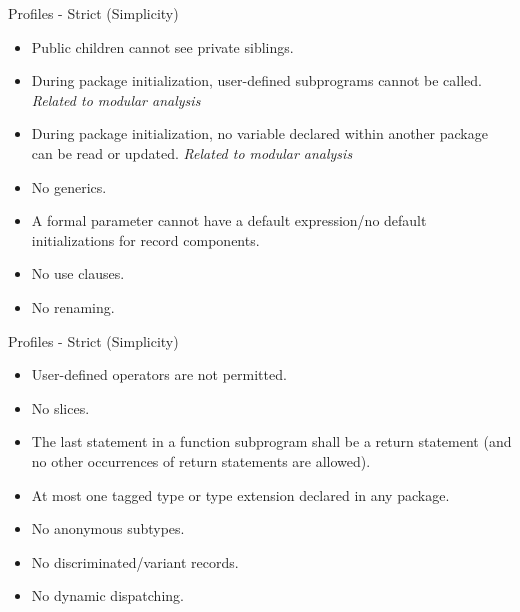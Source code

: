 \documentclass{beamer}
\begin{document}
\begin{frame}{Profiles - Strict (Simplicity)}

  \begin{itemize}

  \item Public children cannot see private siblings.

  \item During package initialization, user-defined subprograms cannot be called.
        \emph{Related to modular analysis}

  \item During package initialization, no variable declared within another package
        can be read or updated. \emph{Related to modular analysis}

  \item No generics.

  \item A formal parameter cannot have a default expression/no
        default initializations for record components.

  \item No use clauses.

  \item No renaming.

  \end{itemize}
\end{frame}

\begin{frame}{Profiles - Strict (Simplicity)}

  \begin{itemize}

  \item User-defined operators are not permitted.

  \item No slices.

  \item The last statement in a function subprogram shall be a return statement
        (and no other occurrences of return statements are allowed).

  \item At most one tagged type or type extension declared in any package.

  \item No anonymous subtypes.

  \item No discriminated/variant records.

  \item No dynamic dispatching.

  \end{itemize}

\end{frame}
\end{document}

